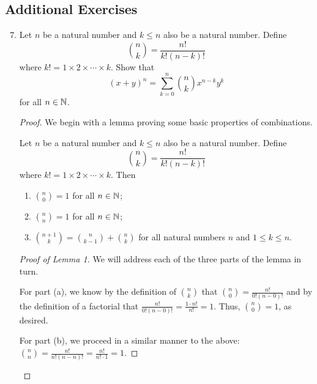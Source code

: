 \documentclass[../main.tex]{subfiles}
\begin{document}
\subsection*{Additional Exercises}
\begin{enumerate}
    \setcounter{enumi}{6}
    \item {}Let $n$ be a natural number and $k\leq n$ also be a natural number. Define
    \begin{equation*}
        \binom{n}{k} = \frac{n!}{k!(n-k)!}
    \end{equation*}
    where $k!=1\times 2\times\cdots\times k$. Show that
    \begin{equation*}
        (x+y)^n = \sum_{k=0}^n\binom{n}{k}x^{n-k}y^k
    \end{equation*}
    for all $n\in\mathbb{N}$.\par
    \begin{proof}
        We begin with a lemma proving some basic properties of combinations.
        \setcounter{theorem}{0}
        \begin{lemma*}
            Let $n$ be a natural number and $k\leq n$ also be a natural number. Define
            \begin{equation*}
                \binom{n}{k} = \frac{n!}{k!(n-k)!}
            \end{equation*}
            where $k!=1\times 2\times\cdots\times k$. Then
            \begin{enumerate}[label={\alph*\textup{)}}]
                \item $\binom{n}{0}=1$ for all $n\in\mathbb{N}$;
                \item $\binom{n}{n}=1$ for all $n\in\mathbb{N}$;
                \item $\binom{n+1}{k}=\binom{n}{k-1}+\binom{n}{k}$ for all natural numbers $n$ and $1\leq k\leq n$.
            \end{enumerate}
            \begin{proof}[Proof of Lemma 1]
                We will address each of the three parts of the lemma in turn.\par
                For part (a), we know by the definition of $\binom{n}{k}$ that $\binom{n}{0}=\frac{n!}{0!(n-0)!}$ and by the definition of a factorial that $\frac{n!}{0!(n-0)!}=\frac{1\cdot n!}{n!}=1$. Thus, $\binom{n}{0}=1$, as desired.\par
                For part (b), we proceed in a similar manner to the above: $\binom{n}{n}=\frac{n!}{n!(n-n)!}=\frac{n!}{n!\cdot 1}=1$.\par

\end{proof}
\end{lemma*}
\end{proof}
\end{enumerate}
\end{document}

